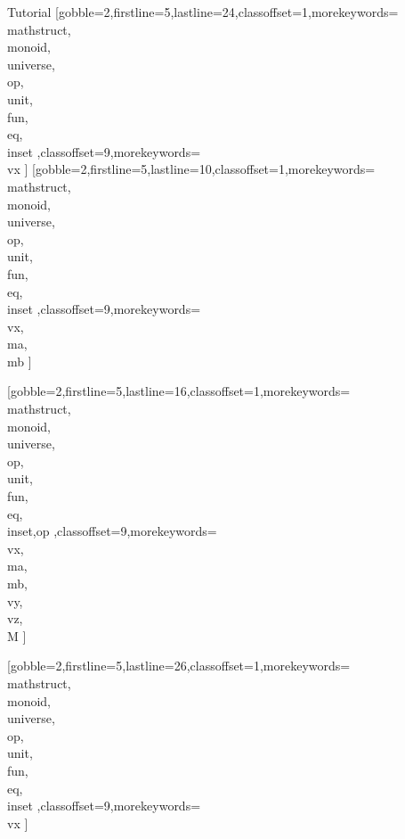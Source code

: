 \documentclass{stex}
\begin{document}
\begin{sfragment}{Tutorial}
    [gobble=2,firstline=5,lastline=24,classoffset=1,morekeywords={
    \\mathstruct,\\monoid,\\universe,\\op,\\unit,\\fun,\\eq,\\inset
    },classoffset=9,morekeywords={
      \\vx
    }]
    [gobble=2,firstline=5,lastline=10,classoffset=1,morekeywords={
    \\mathstruct,\\monoid,\\universe,\\op,\\unit,\\fun,\\eq,\\inset
    },classoffset=9,morekeywords={
      \\vx,\\ma,\\mb
    }]

    [gobble=2,firstline=5,lastline=16,classoffset=1,morekeywords={
    \\mathstruct,\\monoid,\\universe,\\op,\\unit,\\fun,\\eq,\\inset,op
    },classoffset=9,morekeywords={
      \\vx,\\ma,\\mb,\\vy,\\vz,\\M
    }]

    [gobble=2,firstline=5,lastline=26,classoffset=1,morekeywords={
    \\mathstruct,\\monoid,\\universe,\\op,\\unit,\\fun,\\eq,\\inset
    },classoffset=9,morekeywords={
      \\vx
    }]


\end{sfragment}
\end{document}
